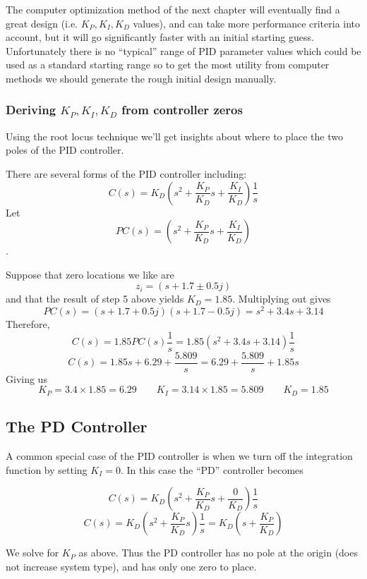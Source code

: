 The computer optimization method of the next chapter will eventually find a great design (i.e. $K_P,K_I,K_D$ values), and can take more performance criteria into account, but it will go significantly faster with an initial starting guess.   Unfortunately there is no ``typical'' range of PID parameter values which could be used as a standard starting range so to get the most utility from computer methods we should generate the rough initial design manually.


\subsubsection{Deriving $K_P, K_I, K_D$ from controller zeros}\label{Kpderive}

Using the root locus technique we'll get insights about where to place
the two poles of the PID controller.

There are several forms of the PID controller including:
\[
C(s) = K_D \left ( s^2+ \frac{K_P}{K_D}s + \frac{K_I}{K_D} \right ) \frac{1}{s}
\]
Let
\[
PC(s) = \left ( s^2+ \frac{K_P}{K_D}s + \frac{K_I}{K_D} \right )
\].

Suppose that zero locations we like are
\[
z_i = (s + 1.7 \pm 0.5j)
\]
and that the result of step 5 above yields $K_D = 1.85$.   Multiplying out gives
\[
PC(s) = (s + 1.7 + 0.5j)(s + 1.7 - 0.5j)  = s^2 + 3.4s + 3.14
\]
Therefore,
\[
C(s) = 1.85 PC(s) \frac{1}{s} = 1.85(s^2 + 3.4s + 3.14)\frac{1}{s}
\]
\[
C(s) = 1.85s + 6.29 + \frac {5.809} {s} = 6.29 + \frac {5.809} {s} + 1.85s
\]
Giving us
\[
K_P = 3.4\times 1.85 = 6.29   \qquad  K_I = 3.14\times1.85 = 5.809 \qquad K_D = 1.85
\]

\subsection{The PD Controller}
A common special case of the PID controller is when we turn off the
integration function by setting $K_I=0$.
In this case the ``PD''  controller becomes

\[
C(s) = K_D \left ( s^2+ \frac{K_P}{K_D}s + \frac{0}{K_D} \right ) \frac{1}{s}
\]
 \[
 C(s) = K_D \left ( s^2+ \frac{K_P}{K_D}s \right ) \frac{1}{s} = K_D\left ( s+\frac {K_P}  {K_D} \right )
 \]

We solve for $K_P$ as above.
Thus the PD controller has no pole at the origin (does not increase
 system type), and has only one zero to place.


